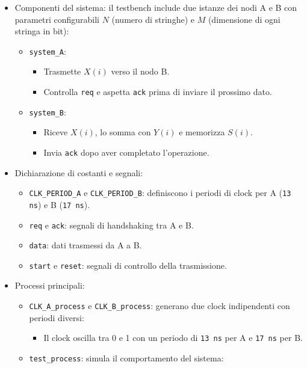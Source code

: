 \begin{itemize}
    \item{Componenti del sistema:} il testbench include due istanze dei nodi A e B con parametri configurabili $N$ (numero di stringhe) e $M$ (dimensione di ogni stringa in bit):
    \begin{itemize}
        \item \texttt{system\_A}:
        \begin{itemize}
            \item Trasmette $X(i)$ verso il nodo B.
            \item Controlla \texttt{req} e aspetta \texttt{ack} prima di inviare il prossimo dato.
        \end{itemize}
        \item \texttt{system\_B}:
        \begin{itemize}
            \item Riceve $X(i)$, lo somma con $Y(i)$ e memorizza $S(i)$.
            \item Invia \texttt{ack} dopo aver completato l'operazione.
        \end{itemize}
    \end{itemize}
    \item{Dichiarazione di costanti e segnali:}
    \begin{itemize}
        \item \texttt{CLK\_PERIOD\_A} e \texttt{CLK\_PERIOD\_B}: definiscono i periodi di clock per A (\texttt{13 ns}) e B (\texttt{17 ns}).
        \item \texttt{req} e \texttt{ack}: segnali di handshaking tra A e B.
        \item \texttt{data}: dati trasmessi da A a B.
        \item \texttt{start} e \texttt{reset}: segnali di controllo della trasmissione.
    \end{itemize}
    \item{Processi principali:}
    \begin{itemize}
        \item \texttt{CLK\_A\_process} e \texttt{CLK\_B\_process}: generano due clock indipendenti con periodi diversi:
        \begin{itemize}
            \item Il clock oscilla tra 0 e 1 con un periodo di \texttt{13 ns} per A e \texttt{17 ns} per B.
        \end{itemize}
        \item \texttt{test\_process}: simula il comportamento del sistema:

\end{itemize}
\end{itemize}
